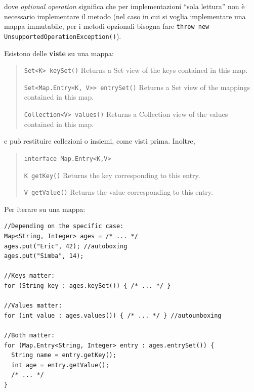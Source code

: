 \documentclass[\fontsizeclass,twocolumn]{\classname}
\theoremstyle{definition}
\theoremstyle{definition}
\begin{document}
dove \emph{optional operation} significa che per implementazioni ``sola
lettura'' non è necessario implementare il metodo (nel caso in cui si voglia
implementare una mappa immutabile, per i metodi opzionali bisogna fare
\texttt{throw new Unsupported\-Operation\-Exception()}).

Esistono delle \textbf{viste} su una mappa:
\begin{quote}
    \footnotesize{\texttt{Set<K> 	keySet()} 	Returns a Set view of the keys contained in this map.

\texttt{Set<Map.Entry<K, V>> 	entrySet()} 	Returns a Set view of the mappings contained in this map.

\texttt{Collection<V> 	values()} 	Returns a Collection view of the values contained in this map.}
\end{quote}

e può restituire collezioni o insiemi, come visti prima. Inoltre,
\begin{quote}
    \footnotesize{\texttt{interface Map.Entry<K,V>}

        \texttt{K 	getKey()} 	Returns the key corresponding to this entry.

    \texttt{V 	getValue()} 	Returns the value corresponding to this entry.}
\end{quote}

Per iterare su una mappa:


\begin{lstlisting}
//Depending on the specific case:
Map<String, Integer> ages = /* ... */
ages.put("Eric", 42); //autoboxing
ages.put("Simba", 14);

//Keys matter:
for (String key : ages.keySet()) { /* ... */ }

//Values matter:
for (int value : ages.values()) { /* ... */ } //autounboxing

//Both matter:
for (Map.Entry<String, Integer> entry : ages.entrySet()) {
  String name = entry.getKey();
  int age = entry.getValue();
  /* ... */
}
\end{lstlisting}
\end{document}
